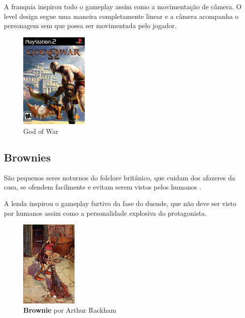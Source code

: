 A franquia inspirou todo o gameplay assim como a movimentação de câmera. O level design segue uma maneira completamente linear e a câmera acompanha o personagem sem que possa ser movimentada pelo jogador.

\begin{figure}[!htb] \caption{\label{god_of_war}God of War} \begin{center}
\includegraphics[width=0.3\textwidth]{imagens/GodofWar.jpg} \end{center}
 \end{figure}

\clearpage

\subsection{Brownies}

São pequenos seres noturnos do folclore britânico, que cuidam dos afazeres da casa, se ofendem facilmente e evitam serem vistos pelos humanos \cite{britannica_2011, carolyn_2016}.

A lenda inspirou o gameplay furtivo da fase do duende, que não deve ser visto por humanos assim como a personalidade explosiva do protagonista.

\begin{figure}[!htb]
    \caption{\label{fig_brownie}\textbf{Brownie} por Arthur Rackham }
    \begin{center} \includegraphics[width=0.25\textwidth]{imagens/brownie.jpg}
    \end{center}  \end{figure}

